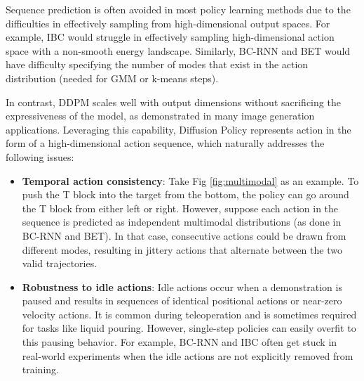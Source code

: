 \documentclass[Afour,sageh,times]{sagej}
\begin{document}


Sequence prediction is often avoided in most policy learning methods due to the difficulties in effectively sampling from high-dimensional output spaces. For example, IBC would struggle in effectively sampling high-dimensional action space with a non-smooth energy landscape. Similarly, BC-RNN and BET would have difficulty specifying the number of modes that exist in the action distribution (needed for GMM or k-means steps).  

In contrast, DDPM scales well with output dimensions without sacrificing the expressiveness of the model, as demonstrated in many image generation applications. Leveraging this capability, Diffusion Policy represents action in the form of a high-dimensional action sequence, which naturally addresses the following issues: 

\begin{itemize} [leftmargin=3mm]
    \item \textbf{Temporal action consistency}: Take Fig \ref{fig:multimodal} as an example. To push the T block into the target from the bottom, the policy can go around the T block from either left or right. However, suppose each action in the sequence is predicted as independent multimodal distributions (as done in BC-RNN and BET). In that case, consecutive actions could be drawn from different modes, resulting in jittery actions that alternate between the two valid trajectories. 

    \item \textbf{Robustness to idle actions}: Idle actions occur when a demonstration is paused and results in sequences of identical positional actions or near-zero velocity actions. It is common during teleoperation and is sometimes required for tasks like liquid pouring. However, single-step policies can easily overfit to this pausing behavior. For example, BC-RNN and IBC often get stuck in real-world experiments when the idle actions are not explicitly removed from training. 
    
\end{itemize}
\end{document}
